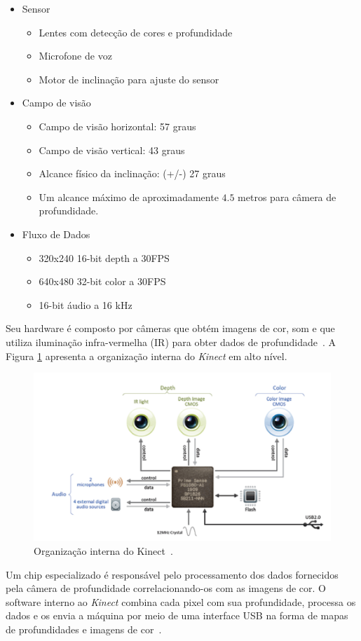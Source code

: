 	\begin{itemize}
		\item Sensor
			\begin{itemize}
				\item Lentes com detecção de cores e profundidade
				\item Microfone de voz
				\item Motor de inclinação para ajuste do sensor
			\end{itemize}
		\item Campo de visão
			\begin{itemize}
				\item Campo de visão horizontal: 57 graus
				\item Campo de visão vertical: 43 graus
				\item Alcance físico da inclinação: (+/-) 27 graus
				\item Um alcance máximo de aproximadamente $\displaystyle 4.5$ metros para câmera de profundidade. 
			\end{itemize}
		\item Fluxo de Dados
			\begin{itemize}
				\item 320x240 16-bit depth a 30FPS
				\item 640x480 32-bit color a 30FPS
				\item 16-bit áudio a 16 kHz
			\end{itemize}
	\end{itemize}

Seu hardware é composto por câmeras que obtém imagens de cor, som e que utiliza iluminação infra-vermelha (IR) para obter dados de profundidade~\cite{kinect}. A Figura \ref{kinect_interno} apresenta a organização interna do \textit{Kinect} em alto nível.

	\begin{figure}[hbt]
		\begin{center}
			\includegraphics[scale=0.8]{figuras/2.FundamentacaoTeorica/kinect_interno.png}
		\end{center}
		\caption{Organização interna do Kinect~\cite{kinect}.}
		\label{kinect_interno}
	\end{figure}

Um chip especializado é responsável pelo processamento dos dados fornecidos pela câmera de profundidade correlacionando-os com as imagens de cor. O software interno ao \textit{Kinect} combina cada pixel com sua profundidade, processa os dados e os envia a máquina por meio de uma interface USB na forma de mapas de profundidades e imagens de cor~\cite{kinect}.


